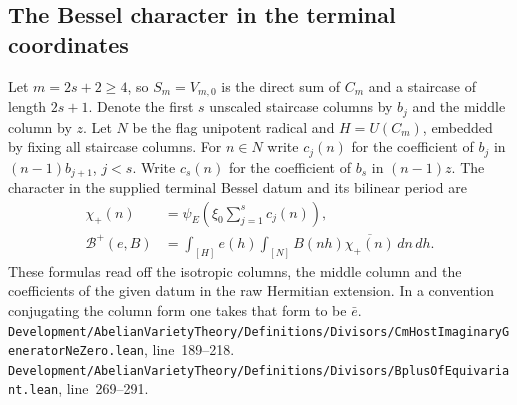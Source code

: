 \documentclass[a4paper,11pt]{article}
\theoremstyle{definition}
\theoremstyle{remark}
\newcommand{\srcloc}[2]{{\small\nolinkurl{#1.lean}}, line~#2}
\numberwithin{equation}{section}
\begin{document}
\subsection{The Bessel character in the terminal coordinates}\label{nav:VIII-42}
Let \(m=2s+2\ge4\), so \(S_m=V_{m,0}\) is the direct sum
of \(C_m\) and a staircase of length \(2s+1\). Denote the
first \(s\) unscaled staircase columns by \(b_j\) and the
middle column by \(z\). Let \(N\) be the flag unipotent
radical and \(H=U(C_m)\), embedded by fixing all staircase
columns. For \(n\in N\) write \(c_j(n)\) for the coefficient
of \(b_j\) in \((n-1)b_{j+1}\), \(j<s\). Write \(c_s(n)\)
for the coefficient of \(b_s\) in \((n-1)z\). The character
in the supplied terminal Bessel datum and its bilinear period
are
\[
 \begin{split}
  \chi_+(n)&=\psi_E\!\left(\xi_0\sum_{j=1}^s c_j(n)\right),\\
  \mathcal B^+(e,B)&=\int_{[H]} e(h)
             \int_{[N]}B(nh)\overline{\chi_+(n)}\,dn\,dh .
 \end{split}
\]
These formulas read off the isotropic columns, the middle
column and the coefficients of the given datum in the raw
Hermitian extension. In a convention conjugating the column
form one takes that form to be \(\bar e\).
\srcloc{Development/AbelianVarietyTheory/Definitions/Divisors/CmHostImaginaryGeneratorNeZero}{189--218}.
\srcloc{Development/AbelianVarietyTheory/Definitions/Divisors/BplusOfEquivariant}{269--291}.
\end{document}
